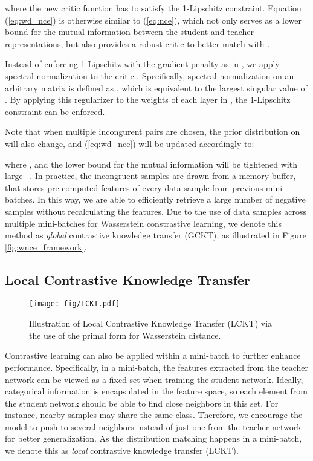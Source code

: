 \documentclass[final]{cvpr}
\theoremstyle{definition}
\begin{document}
where the new critic function  has to satisfy the 1-Lipschitz constraint.
Equation (\ref{eq:wd_nce}) is otherwise similar to (\ref{eq:nce}), 
which not only serves as a lower bound for the mutual information between the student and teacher representations, but also provides a robust critic to better match  with . 

Instead of enforcing 1-Lipschitz with the gradient penalty as in \cite{gulrajani2017improved}, we apply spectral normalization \cite{miyato2018spectral} to the critic . Specifically,
spectral normalization on an arbitrary matrix  is defined as , which is equivalent to the largest singular value of . 
By applying this regularizer to the weights of each layer in , the 1-Lipschitz constraint can be enforced.


Note that when multiple incongurent pairs are chosen, the prior distribution on  will also change, and (\ref{eq:wd_nce}) will be updated accordingly to:

where , and the lower bound for the mutual information will be tightened with large ~\cite{gutmann2010noise, tian2019contrastive}.
In practice, the incongruent samples are drawn from a memory buffer, that stores pre-computed features of every data sample from previous mini-batches. In this way, we are able to efficiently retrieve a large number of negative samples without recalculating the features. 
Due to the use of data samples across multiple mini-batches for Wasserstein constrastive learning, we denote this method as \emph{global} contrastive knowledge transfer (GCKT), as illustrated in Figure \ref{fig:wnce_framework}.








\subsection{Local Contrastive Knowledge Transfer}\label{subsec:wasserstein_primal_form}
\begin{figure}[!t]
    \centering
    \texttt{[image: fig/LCKT.pdf]}
\vspace{-2mm}
    \caption{\small\label{fig:pwd_framework} Illustration of Local Contrastive Knowledge Transfer (LCKT) via the use of the primal form for Wasserstein distance.}
    \vspace{-4mm}
\end{figure}
Contrastive learning can also be applied within a mini-batch to further enhance performance. Specifically, in a mini-batch, the features  extracted from the teacher network can be viewed as a fixed set when training the student network. Ideally, categorical information is encapsulated in the feature space, so each element  from the student network should be able to find close neighbors in this set. For instance, nearby samples may share the same class. Therefore, we encourage the model to push  to several neighbors   instead of just one from the teacher network for better generalization. As the distribution matching happens in a mini-batch, we denote this as \emph{local} contrastive knowledge transfer (LCKT).
\end{document}

